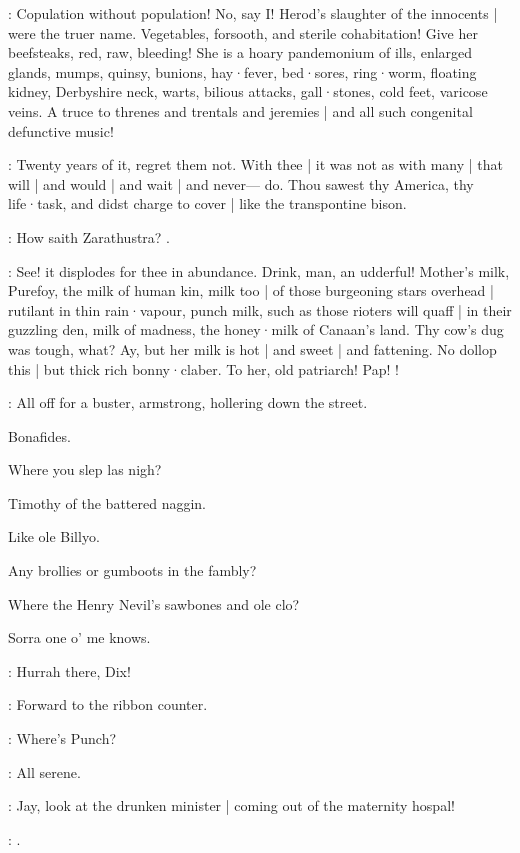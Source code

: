 :
Copulation without population!
No,
say I!
Herod's slaughter of the innocents |
were the truer name.
Vegetables,
forsooth,
and sterile cohabitation!
Give her beefsteaks,
red,
raw,
bleeding!
She is a hoary pandemonium of ills,
enlarged glands,
mumps,
quinsy,
bunions,
hay·fever,
bed·sores,
ring·worm,
floating kidney,
Derbyshire neck,
warts,
bilious attacks,
gall·stones,
cold feet,
varicose veins.
A truce to threnes and trentals and jeremies |
and all such congenital defunctive music!

:
Twenty years of it,
regret them not.
With thee |
it was not as with many |
that will |
and would |
and wait |
and never---%
do.
Thou sawest thy America,
thy life·task,
and didst charge to cover |
like the transpontine bison.

:
How saith Zarathustra?
.

:
See!
it displodes for thee in abundance.
Drink,
man,
an udderful!
Mother's milk,
Purefoy,
the milk of human kin,
milk too |
of those burgeoning stars overhead |
rutilant in thin rain·vapour,
punch milk,
such as those rioters will quaff |
in their guzzling den,
milk of madness,
the honey·milk of Canaan's land.
Thy cow's dug was tough,
what?
Ay,
but her milk is hot |
and sweet |
and fattening.
No dollop this |
but thick rich bonny·claber.
To her,
old patriarch!
Pap!
!


:
All off for a buster,
armstrong,
hollering down the street.

Bonafides.

Where you slep las nigh?

Timothy of the battered naggin.

Like ole Billyo.

Any brollies or gumboots in the fambly?

Where the Henry Nevil's sawbones and ole clo?

Sorra one o' me knows.

\madden:
Hurrah there,
Dix!

:
Forward to the ribbon counter.

\dixon:
Where's Punch?

:
All serene.

\bystander:
Jay,
look at the drunken minister |
coming out of the maternity hospal!

\mulligan:
.

